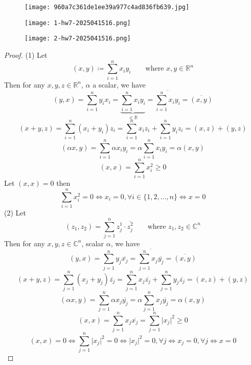 \begin{figure}[H]
\centering
\texttt{[image: 960a7c361de1ee39a977c4ad836fb639.jpg]}
\label{}
\end{figure}

\begin{exercise}
\begin{figure}[H]
\centering
\texttt{[image: 1-hw7-2025041516.png]}
\label{}
\end{figure}
\end{exercise}
\begin{definition}
\begin{figure}[H]
\centering
\texttt{[image: 2-hw7-2025041516.png]}
\label{}
\end{figure}
\end{definition}
\begin{proof}
(1) Let
\[
(x,y)\coloneqq \sum_{i=1}^{n} x_iy_i \qquad \text{where }x,y\in \mathbb{R}^{n}
\]
Then for any $x, y, z\in \mathbb{R}^{n}$, $\alpha$ a scalar, we have
\[
(y,x)=\sum_{i=1}^{n} y_ix_i=\underbrace{ \sum_{i=1}^{n} x_iy_i }_{ \in \mathbb{R} }=\overline{\sum_{i=1}^{n} x_iy_i}=\overline{(x,y)}
\]
\[
(x+y,z)=\sum_{i=1}^{n} (x_i+y_i)z_i=\sum_{i=1}^{n} x_iz_i+\sum_{i=1}^{n} y_iz_i=(x,z)+(y,z)
\]
\[
(\alpha x,y)=\sum_{i=1}^{n} \alpha x_iy_i=\alpha \sum_{i=1}^{n} x_iy_i=\alpha(x,y)
\]
\[
(x,x)=\sum_{i=1}^{n} x_i^2\geq 0
\]
Let $(x,x)=0$ then
\[
\sum_{i=1}^{n} x_i^2=0\iff x_i=0,\forall i\in \{ 1,2,\dots,n \}\iff x=0
\]
(2)
Let
\[
(z_1,z_2)=\sum_{j=1}^{n} z^{1}_j\cdot  \overline{z^{2}_{j}}\qquad \text{where }z_1,z_2\in \mathbb{C}^{n}
\]
Then for any $x, y, z\in \mathbb{C}^{n}$, scalar $\alpha$, we have
\[
(y,x)=\sum_{j=1}^{n} y_j \overline{x_j}=\overline{\sum_{j=1}^{n} x_j \overline{y_j}}=\overline{(x,y)}
\]
\[
(x+y,z)=\sum_{j=1}^{n} (x_j+y_j)\overline{z_j}=\sum_{j=1}^{n} x_j \overline{z_j}+\sum_{j=1}^{n} y_j \overline{z_j}=(x,z)+(y,z)
\]
\[
(\alpha x,y)=\sum_{j=1}^{n} \alpha x_j \overline{y_j}=\alpha \sum_{j=1}^{n} x_j \overline{ y_j}=\alpha(x,y)
\]
\[
(x,x)=\sum_{j=1}^{n} x_j \overline{x_j}=\sum_{j=1}^{n} \lvert x_j \rvert ^2\geq 0
\]
\[
(x,x)=0\iff \sum_{j=1}^{n} \lvert x_j \rvert ^2=0\iff \lvert x_j \rvert ^2=0,\forall j\iff x_j=0,\forall j\iff x=0
\]
\end{proof}

